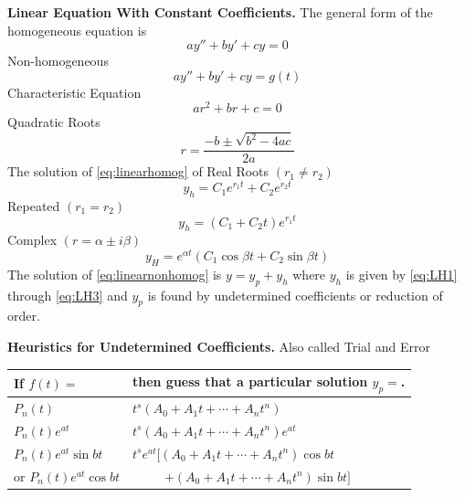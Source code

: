\documentclass[../main.tex]{subfiles}
\begin{document}
    \textbf{Linear Equation With Constant Coefficients.} The general form of the homogeneous equation is  
    \begin{equation}
        ay'' + by' + cy=0 \label{eq:linearhomog}
    \end{equation}
    Non-homogeneous
    \begin{equation}
        ay''+by'+cy = g(t)\label{eq:linearnonhomog}
    \end{equation}
Characteristic Equation
\begin{equation*}
    ar^2 + br + c=0
\end{equation*}
Quadratic Roots
\begin{equation}
    r=\frac{-b\pm\sqrt{b^2-4ac}}{2a}
\end{equation}
The solution of \eqref{eq:linearhomog} of Real Roots $(r_1 \neq r_2)$
\begin{equation}
    y_h = C_1 e^{r_1 t} + C_2 e^{r_2t} \label{eq:LH1}
\end{equation}
Repeated $(r_1 = r_2)$
\begin{equation}
    y_h = (C_1 + C_2 t)e^{r_1t}\label{eq:LH2}
\end{equation}
Complex $(r=\alpha\pm i\beta)$
\begin{equation}
    y_H=e^{\alpha t}(C_1 \cos \beta t + C_2 \sin \beta t) \label{eq:LH3}
\end{equation}
    The solution of \eqref{eq:linearnonhomog} is $y=y_p+y_h$ where $y_h$ is given by \eqref{eq:LH1} through \eqref{eq:LH3} and $y_p$ is found by undetermined coefficients or reduction of order.
    
    \textbf{Heuristics for Undetermined Coefficients.} Also called Trial and Error


\begin{center}
        \begin{tabular}{|l|l|}
        \hline 
        If $f(t)=$ & then guess that a particular solution $y_p=$. \\
        \hline\hline
        $P_n(t)$ & $t^s (A_0 + A_1 t + \cdots + A_n t^n)$ \\
        \hline 
        $P_n(t)e^{at}$ & $t^s (A_0 + A_1 t + \cdots + A_n t^n)e^{at}$ \\
        \hline
        $P_n(t)e^{at}\sin bt$ & $t^s e^{at} [(A_0 + A_1 t + \cdots + A_n t^n)\cos bt$ \\
        or $P_n(t)e^{at}\cos bt$ & \ \ \ \ \ $ + (A_0 + A_1 t + \cdots + A_n t^n)\sin bt]$ \\
        \hline 
        \end{tabular}
\end{center}
\end{document}
